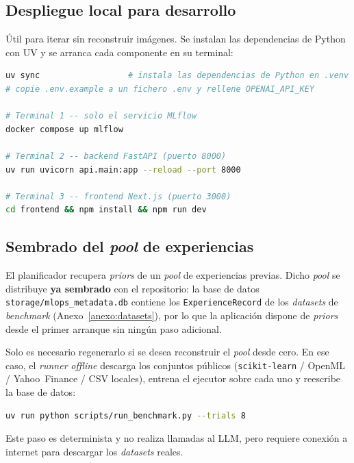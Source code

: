 \subsection{Despliegue local para desarrollo}
\label{anexo:repro-local}

Útil para iterar sin reconstruir imágenes. Se instalan las dependencias de Python con
UV y se arranca cada componente en su terminal:

\begin{lstlisting}[language=bash]
uv sync                  # instala las dependencias de Python en .venv
# copie .env.example a un fichero .env y rellene OPENAI_API_KEY

# Terminal 1 -- solo el servicio MLflow
docker compose up mlflow

# Terminal 2 -- backend FastAPI (puerto 8000)
uv run uvicorn api.main:app --reload --port 8000

# Terminal 3 -- frontend Next.js (puerto 3000)
cd frontend && npm install && npm run dev
\end{lstlisting}

\subsection{Sembrado del \textit{pool} de experiencias}
\label{anexo:repro-pool}

El planificador recupera \textit{priors} de un \textit{pool} de experiencias previas.
Dicho \textit{pool} se distribuye \textbf{ya sembrado} con el repositorio: la base de
datos \texttt{storage/mlops\_metadata.db} contiene los \texttt{ExperienceRecord} de los
\textit{datasets} de \textit{benchmark} (Anexo~\ref{anexo:datasets}), por lo que la
aplicación dispone de \textit{priors} desde el primer arranque sin ningún paso adicional.

Solo es necesario regenerarlo si se desea reconstruir el \textit{pool} desde cero. En ese
caso, el \textit{runner} \textit{offline} descarga los conjuntos públicos
(\texttt{scikit-learn} / OpenML / Yahoo~Finance / CSV locales), entrena el ejecutor sobre
cada uno y reescribe la base de datos:

\begin{lstlisting}[language=bash]
uv run python scripts/run_benchmark.py --trials 8
\end{lstlisting}

\noindent
Este paso es determinista y no realiza llamadas al LLM, pero requiere conexión a
internet para descargar los \textit{datasets} reales.

